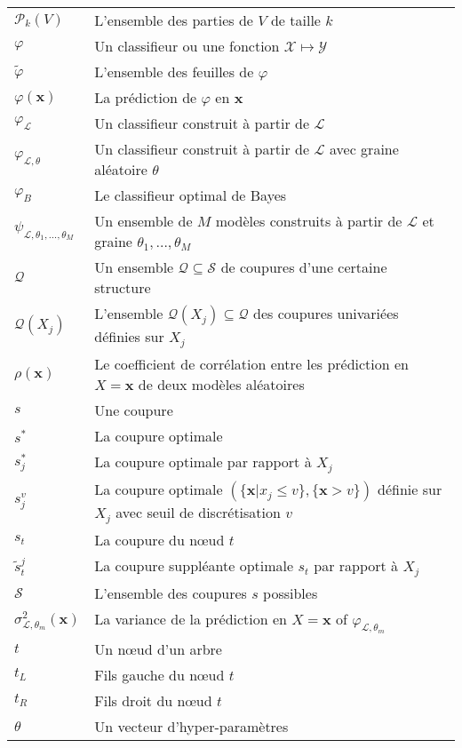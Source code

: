 \begin{tabularx}{\textwidth}{ l X }
$\mathcal{P}_k(V)$ & L'ensemble des parties de $V$ de taille $k$   \\
$\varphi$ & Un classifieur ou une fonction $\mathcal{X} \mapsto \mathcal{Y}$   \\
$\widetilde{\varphi}$ & L'ensemble des feuilles de $\varphi$   \\
$\varphi(\mathbf{x})$ & La prédiction de $\varphi$ en $\mathbf{x}$   \\
$\varphi_\mathcal{L}$ & Un classifieur construit à partir de $\mathcal{L}$   \\
$\varphi_{\mathcal{L},\theta}$ & Un classifieur construit à partir de $\mathcal{L}$ avec graine aléatoire $\theta$   \\
$\varphi_B$ & Le classifieur optimal de Bayes   \\
$\psi_{\mathcal{L},\theta_1,\dots,\theta_M}$ & Un ensemble de $M$ modèles construits à partir de $\mathcal{L}$ et graine $\theta_1, \dots, \theta_M$   \\
$\mathcal{Q}$ & Un ensemble $\mathcal{Q} \subseteq \mathcal{S}$ de coupures d'une certaine structure  \\
$\mathcal{Q}(X_j)$ & L'ensemble $\mathcal{Q}(X_j) \subseteq \mathcal{Q}$ des coupures univariées définies sur $X_j$  \\
$\rho(\mathbf{x})$ & Le coefficient de corrélation entre les prédiction en $X=\mathbf{x}$ de deux modèles aléatoires   \\
$s$ & Une coupure   \\
$s^*$ & La coupure optimale   \\
$s^*_j$ & La coupure optimale par rapport à $X_j$  \\
$s_j^v$ & La coupure optimale $(\{\mathbf{x}|x_j \leq v\}, \{\mathbf{x} > v\})$ définie sur $X_j$ avec seuil de discrétisation $v$   \\
$s_t$ & La coupure du nœud $t$   \\
$\tilde{s}^j_t$ & La coupure suppléante optimale $s_t$ par rapport à $X_j$  \\
$\mathcal{S}$ & L'ensemble des coupures $s$ possibles   \\
$\sigma^2_{\mathcal{L},\theta_m}(\mathbf{x})$ & La variance de la prédiction en $X = \mathbf{x}$ of $\varphi_{\mathcal{L},\theta_m}$   \\
$t$ & Un nœud d'un arbre   \\
$t_L$ & Fils gauche du nœud $t$  \\
$t_R$ & Fils droit du nœud $t$  \\
$\theta$ & Un vecteur d'hyper-paramètres   \\

\end{tabularx}
